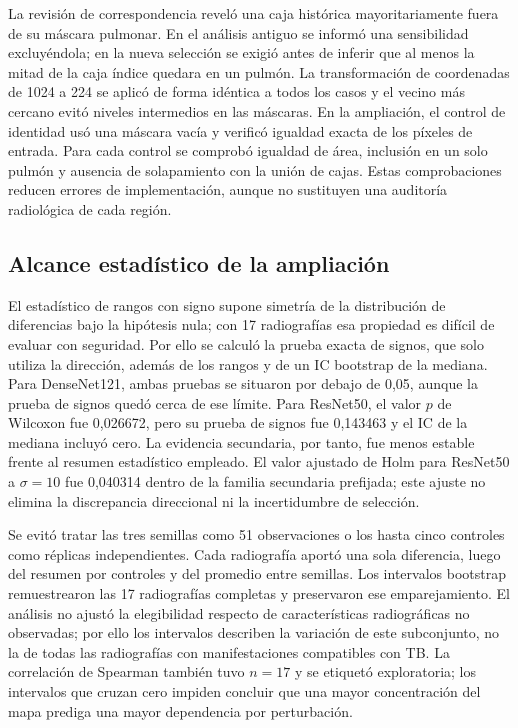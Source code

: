 \documentclass[conference]{IEEEtran}
\begin{document}
La revisión de correspondencia reveló una caja histórica mayoritariamente fuera de su máscara pulmonar. En el análisis antiguo se informó una sensibilidad excluyéndola; en la nueva selección se exigió antes de inferir que al menos la mitad de la caja índice quedara en un pulmón. La transformación de coordenadas de 1024 a 224 se aplicó de forma idéntica a todos los casos y el vecino más cercano evitó niveles intermedios en las máscaras. En la ampliación, el control de identidad usó una máscara vacía y verificó igualdad exacta de los píxeles de entrada. Para cada control se comprobó igualdad de área, inclusión en un solo pulmón y ausencia de solapamiento con la unión de cajas. Estas comprobaciones reducen errores de implementación, aunque no sustituyen una auditoría radiológica de cada región.

\subsection{Alcance estadístico de la ampliación}
El estadístico de rangos con signo supone simetría de la distribución de diferencias bajo la hipótesis nula; con 17 radiografías esa propiedad es difícil de evaluar con seguridad. Por ello se calculó la prueba exacta de signos, que solo utiliza la dirección, además de los rangos y de un IC bootstrap de la mediana. Para DenseNet121, ambas pruebas se situaron por debajo de 0,05, aunque la prueba de signos quedó cerca de ese límite. Para ResNet50, el valor $p$ de Wilcoxon fue 0,026672, pero su prueba de signos fue 0,143463 y el IC de la mediana incluyó cero. La evidencia secundaria, por tanto, fue menos estable frente al resumen estadístico empleado. El valor ajustado de Holm para ResNet50 a $\sigma=10$ fue 0,040314 dentro de la familia secundaria prefijada; este ajuste no elimina la discrepancia direccional ni la incertidumbre de selección.

Se evitó tratar las tres semillas como 51 observaciones o los hasta cinco controles como réplicas independientes. Cada radiografía aportó una sola diferencia, luego del resumen por controles y del promedio entre semillas. Los intervalos bootstrap remuestrearon las 17 radiografías completas y preservaron ese emparejamiento. El análisis no ajustó la elegibilidad respecto de características radiográficas no observadas; por ello los intervalos describen la variación de este subconjunto, no la de todas las radiografías con manifestaciones compatibles con TB. La correlación de Spearman también tuvo $n=17$ y se etiquetó exploratoria; los intervalos que cruzan cero impiden concluir que una mayor concentración del mapa prediga una mayor dependencia por perturbación.
\end{document}
